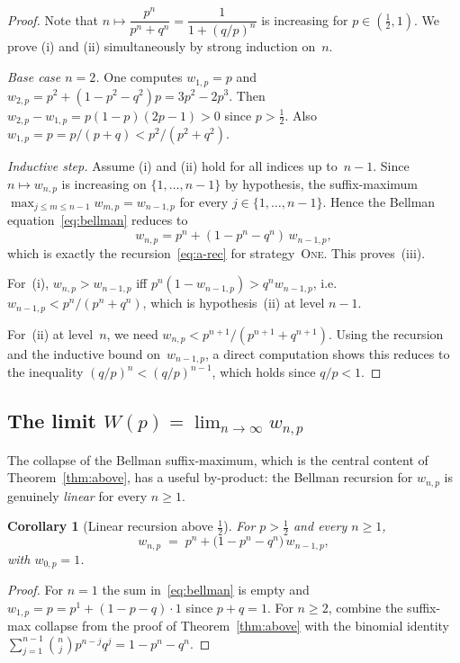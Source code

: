 \documentclass[reqno,final,11pt]{amsart}
\theoremstyle{plain}
\newtheorem{corollary}[theorem]{Corollary}
\theoremstyle{definition}
\theoremstyle{remark}
\newcommand{\One}{\textsc{One}}
\begin{document}
\begin{proof}
  Note that $n\mapsto \dfrac{p^n}{p^n+q^n} = \dfrac{1}{1+(q/p)^n}$ is increasing for $p \in (\tfrac 12, 1)$. 
  We prove (i) and (ii) simultaneously by strong induction on~$n$.

  \emph{Base case $n=2$.}
  One computes $w_{1,p}=p$ and
  $w_{2,p}=p^2+(1-p^2-q^2)p = 3p^2-2p^3$.  Then
  $w_{2,p}-w_{1,p}=p(1-p)(2p-1)>0$ since $p >\tfrac12$.
  Also $w_{1,p}=p = p/(p + q) < p^2/(p^2+q^2)$.

  \emph{Inductive step.}  Assume (i) and (ii) hold for all indices up
  to~$n-1$.  Since $n\mapsto w_{n,p}$ is increasing on
  $\{1,\dots,n-1\}$ by hypothesis, the suffix-maximum
  $\max_{j\le m\le n-1}w_{m,p}=w_{n-1,p}$ for every
  $j\in\{1,\dots,n-1\}$.  Hence the Bellman
  equation~\eqref{eq:bellman} reduces to
  \[
    w_{n,p} = p^n + (1-p^n-q^n)\,w_{n-1,p},
  \]
  which is exactly the recursion~\eqref{eq:a-rec} for
  strategy~\One.  This proves~(iii).

  For~(i), $w_{n,p}>w_{n-1,p}$ iff
  $p^n(1-w_{n-1,p})>q^n w_{n-1,p}$, i.e.\
  $w_{n-1,p}<p^n/(p^n+q^n)$, which is hypothesis~(ii) at level
  $n-1$.

  For~(ii) at level~$n$, we need $w_{n,p}<p^{n+1}/(p^{n+1}+q^{n+1})$.
  Using the recursion and the inductive bound on~$w_{n-1,p}$, a
  direct computation shows this reduces to the inequality
  $(q/p)^n<(q/p)^{n-1}$, which holds since $q/p<1$.
\end{proof}

\subsection{The limit \texorpdfstring{$W(p)=\lim_{n\to\infty}w_{n,p}$}{W(p) = lim w(n,p)}}\label{sec:above-limit}

The collapse of the Bellman suffix-maximum, which is the central
content of Theorem~\ref{thm:above}, has a useful by-product: the
Bellman recursion for $w_{n,p}$ is genuinely \emph{linear} for
every $n\ge 1$.

\begin{corollary}[Linear recursion above $\tfrac12$]\label{cor:above-lin}
  For $p>\tfrac12$ and every $n\ge 1$,
  \begin{equation}\label{eq:above-lin}
    w_{n,p} \;=\; p^n + \bigl(1-p^n-q^n\bigr)\,w_{n-1,p},
  \end{equation}
  with $w_{0,p}=1$.
\end{corollary}

\begin{proof}
  For $n=1$ the sum in~\eqref{eq:bellman} is empty and
  $w_{1,p}=p=p^1+(1-p-q)\cdot 1$ since $p+q=1$.  For $n\ge 2$,
  combine the suffix-max collapse from the proof of
  Theorem~\ref{thm:above} with the binomial identity
  $\sum_{j=1}^{n-1}\binom{n}{j}p^{n-j}q^j=1-p^n-q^n$.
\end{proof}
\end{document}
